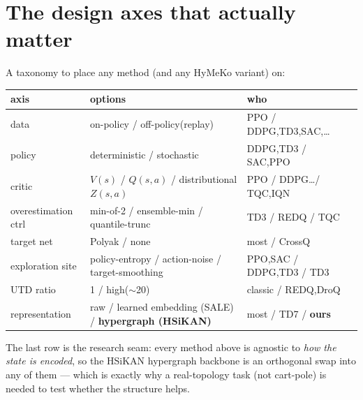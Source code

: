 \documentclass[11pt]{article}
\begin{document}
\section{The design axes that actually matter}
A taxonomy to place any method (and any HyMeKo variant) on:
\begin{center}\small
\begin{tabular}{lll}
\toprule
axis & options & who \\
\midrule
data & on-policy / off-policy(replay) & PPO / DDPG,TD3,SAC,\dots \\
policy & deterministic / stochastic & DDPG,TD3 / SAC,PPO \\
critic & $V(s)$ / $Q(s,a)$ / distributional $Z(s,a)$ & PPO / DDPG\dots / TQC,IQN \\
overestimation ctrl & min-of-2 / ensemble-min / quantile-trunc & TD3 / REDQ / TQC \\
target net & Polyak / none & most / CrossQ \\
exploration site & policy-entropy / action-noise / target-smoothing & PPO,SAC / DDPG,TD3 / TD3 \\
UTD ratio & 1 / high($\sim$20) & classic / REDQ,DroQ \\
representation & raw / learned embedding (SALE) / \textbf{hypergraph (HSiKAN)} & most / TD7 / \textbf{ours} \\
\bottomrule
\end{tabular}
\end{center}
The last row is the research seam: every method above is agnostic to \emph{how the state is encoded}, so the
HSiKAN hypergraph backbone is an orthogonal swap into any of them --- which is exactly why a real-topology
task (not cart-pole) is needed to test whether the structure helps.
\end{document}
